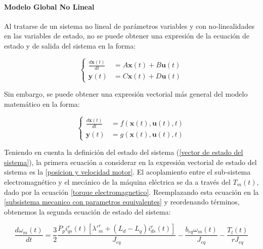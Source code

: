 \documentclass[a4paper, 10pt, onecolumn,journal]{ieeeconf}
\begin{document}
\paragraph{\textbf{Modelo Global No Lineal}}
Al tratarse de un sistema no lineal de parámetros variables y con no-linealidades en las variables de estado, no se puede obtener una expresión
de la ecuación de estado y de salida del sistema en la forma:

\begin{equation*}
    \begin{cases}
        \frac{d \mathbf{x}(t)}{dt} &= A \mathbf{x}(t) + B \mathbf{u}(t)\\
        \mathbf{y}(t) &= C \mathbf{x}(t) + D \mathbf{u}(t)
    \end{cases}
\end{equation*}

Sin embargo, se puede obtener una expresión vectorial más general del modelo matemático en la forma:

\begin{equation*}
    \begin{cases}
        \frac{d \mathbf{x}(t)}{dt} &= f(\mathbf{x}(t), \mathbf{u}(t), t)\\
        \mathbf{y}(t) &= g(\mathbf{x}(t), \mathbf{u}(t), t)
    \end{cases}
\end{equation*}

Teniendo en cuenta la definición del estado del sistema (\cref{vector de estado del sistema}), la primera ecuación a considerar en la expresión vectorial de estado del sistema es la
\cref{posicion y velocidad motor}. El acoplamiento entre el sub-sistema electromagnético y el
mecánico de la máquina eléctrica se da a través del $T_m(t)$, dado por la ecuación \cref{torque electromagnetico}.
Reemplazando esta ecuación en la \cref{subsistema mecanico con parametros equivalentes} y reordenando términos,
obtenemos la segunda ecuación de estado del sistema:

\begin{equation}
    \frac{d \omega_m(t)}{dt} = \frac{3}{2} \frac{P_p i^r_{qs}(t)\left[\lambda'^r_m + (L_d - L_q) i^r_{ds}(t) \right]}{J_{eq}} - \frac{b_{eq}\omega_m(t)}{J_{eq}} - \frac{T_l(t)}{r J_{eq}}
    \label{ecuacion de estado wm}
\end{equation}
\end{document}
